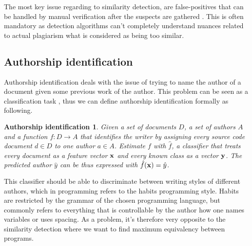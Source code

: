 The most key issue regarding to similarity detection, are false-positives that can be handled by manual verification after the suspects are gathered \cite{Verco:1996:SDS:369585.369598, Roy:2009:CEC:1530898.1531101}. This is often mandatory as detection algorithms can't completely understand nuances related to actual plagiarism \eg what is considered as being too similar. 


%
%
%


\subsection{Authorship identification} \label{chap-ai}

Authorship identification deals with the issue of trying to name the author of a document given some previous work of the author. This problem can be seen as a classification task \cite{KRSUL1997233}, thus we can define authorship identification formally as following.

\newtheorem*{aui1}{Authorship identification}
\begin{aui1}
Given a set of documents $D$, a set of authors $A$ and a function $f: D \rightarrow A$ that identifies the writer by assigning every source code document $d \in D$ to one author $a \in A$. Estimate $f$ with $\hat{f}$, a classifier that treats every document as a feature vector $\mathbf{x}$ and every known class as a vector $\mathbf{y}$. The predicted author $\hat{y}$ can be thus expressed with $\hat{f}(\mathbf{x}) = \hat{y}$.
\end{aui1}

\noindent
This classifier should be able to discriminate between writing styles of different authors, which in programming refers to the habits \ie programming style. Habits are restricted by the grammar of the chosen programming language, but commonly refers to everything that is controllable by the author \eg how one names variables or uses spacing. As a problem, it's therefore very opposite to the similarity detection where we want to find maximum equivalency between programs. 

